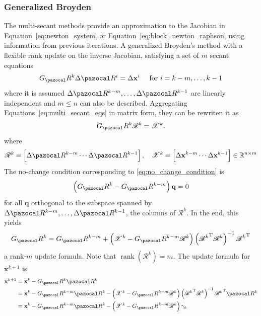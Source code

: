 \subsubsection{Generalized Broyden}

The multi-secant methods provide an approximation to the Jacobian in Equation~\eqref{eq:newton_system} or Equation~\eqref{eq:block_newton_raphson} using information from previous iterations.
A generalized Broyden's method with a flexible rank update on the inverse Jacobian, satisfying a set of \(m\) secant equations
\begin{equation} \label{eq:multi_secant_eqs}
  G_\pazocal R^{k} \Delta \pazocal R^{i}=\Delta \mathbf x^{i} \quad \text { for } i=k-m, \ldots, k-1
\end{equation}
where it is assumed \(\Delta \pazocal R^{k-m}, \ldots, \Delta \pazocal R^{k-1}\) are linearly independent and \(m \leqslant n\) can also be described.
Aggregating Equations~\eqref{eq:multi_secant_eqs} in matrix form, they can be rewriten it as
\begin{equation} \label{eq:multi_secant_eqs_mat}
  G_\pazocal R^{k} \mathscr{R}^{k}=\mathscr{X}^{k}.
\end{equation}
where
\begin{equation}
\mathscr{R}^{k}=\left[\Delta \pazocal R^{k-m} \cdots \Delta \pazocal R^{k-1}\right], \quad \mathscr{X}^{k}=\left[\Delta \mathbf x^{k-m} \cdots \Delta \mathbf x^{k-1}\right] \in \mathbb{R}^{n \times m}
\end{equation}
The no-change condition corresponding to \eqref{eq:no_change_condition} is
\begin{equation}
  \left(G_\pazocal R^{k}-G_\pazocal R^{k-m}\right) \mathbf q=0
\end{equation}
for all \(\mathbf q\) orthogonal to the subspace spanned by \(\Delta \pazocal R^{k-m}, \ldots, \Delta \pazocal R^{k-1}\), the columns of \(\mathscr{R}^{k}\).
In the end, this yields
\begin{equation}
  G_\pazocal R^{k}=G_\pazocal R^{k-m}+\left(\mathscr{X}^{k}-G_\pazocal R^{k-m} \mathscr{R}^{k}\right)\left({\mathscr{R}^{k}}^{\mathrm{T}} \mathscr{R}^{k}\right)^{-1} {\mathscr{R}^{k}}^{\mathrm{T}}
\end{equation}
a rank-\(m\) update formula.
Note that \(\operatorname{rank}\left(\mathscr{R}^{k}\right)=m\).
The update formula for \(\mathbf x^{k+1}\) is
\begin{align}
\mathbf x^{k+1} &=\mathbf x^{k}-G_\pazocal R^{k} \pazocal R^{k} \\
&=\mathbf x^{k}-G_\pazocal R^{k-m} \pazocal R^{k}-\left(\mathscr{X}^{k}-G_\pazocal R^{k-m} \mathscr{R}^{k}\right)\left({\mathscr{R}^{k}}^{\mathrm{T}} \mathscr{R}^{k}\right)^{-1} {\mathscr{R}^{k}}^{\mathrm{T}} \pazocal R^{k} \\
&=\mathbf x^{k}-G_\pazocal R^{k-m} \pazocal R^{k}-\left(\mathscr{X}^{k}-G_\pazocal R^{k-m} \mathscr{R}^{k}\right) \gamma_{k} \label{eq:update_gen_broyden_ls}
\end{align}
